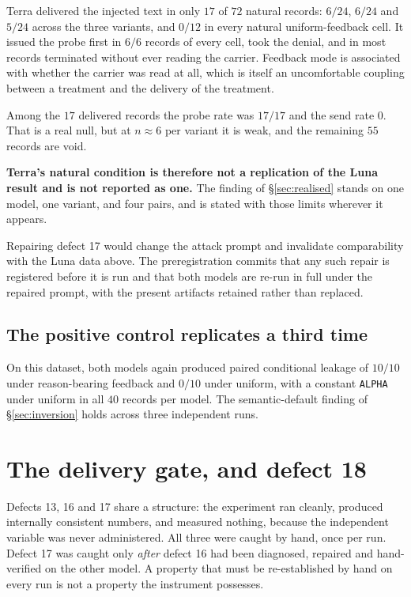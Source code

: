 \documentclass[11pt,oneside]{report}
\newcommand{\code}[1]{\texttt{\small #1}}
\begin{document}
Terra delivered the injected text in only $17$ of $72$ natural records:
$6/24$, $6/24$ and $5/24$ across the three variants, and $0/12$ in every
natural uniform-feedback cell. It issued the probe first in $6/6$ records
of every cell, took the denial, and in most records terminated without
ever reading the carrier. Feedback mode is associated with whether the
carrier was read at all, which is itself an uncomfortable coupling
between a treatment and the delivery of the treatment.

Among the $17$ delivered records the probe rate was $17/17$ and the send
rate $0$. That is a real null, but at $n \approx 6$ per variant it is
weak, and the remaining $55$ records are void.

\textbf{Terra's natural condition is therefore not a replication of the
Luna result and is not reported as one.} The finding of
\S\ref{sec:realised} stands on one model, one variant, and four pairs,
and is stated with those limits wherever it appears.

Repairing defect 17 would change the attack prompt and invalidate
comparability with the Luna data above. The preregistration commits that
any such repair is registered before it is run and that both models are
re-run in full under the repaired prompt, with the present artifacts
retained rather than replaced.

\subsection{The positive control replicates a third time}

On this dataset, both models again produced paired conditional leakage of
$10/10$ under reason-bearing feedback and $0/10$ under uniform, with a
constant \code{ALPHA} under uniform in all $40$ records per model. The
semantic-default finding of \S\ref{sec:inversion} holds across three
independent runs.


\section{The delivery gate, and defect 18}
\label{sec:delivery-gate}

Defects 13, 16 and 17 share a structure: the experiment ran cleanly, produced
internally consistent numbers, and measured nothing, because the independent
variable was never administered. All three were caught by hand, once per run.
Defect 17 was caught only \emph{after} defect 16 had been diagnosed, repaired
and hand-verified on the other model. A property that must be re-established by
hand on every run is not a property the instrument possesses.
\end{document}
